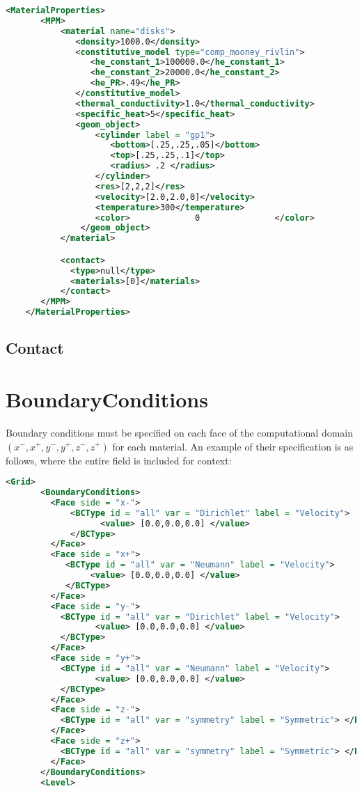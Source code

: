 \begin{lstlisting}[language=XML]
    <MaterialProperties>
       <MPM>
           <material name="disks">
              <density>1000.0</density>
              <constitutive_model type="comp_mooney_rivlin">
                 <he_constant_1>100000.0</he_constant_1>
                 <he_constant_2>20000.0</he_constant_2>
                 <he_PR>.49</he_PR>
              </constitutive_model>
              <thermal_conductivity>1.0</thermal_conductivity>
              <specific_heat>5</specific_heat>
              <geom_object>
                  <cylinder label = "gp1">
                     <bottom>[.25,.25,.05]</bottom>
                     <top>[.25,.25,.1]</top>
                     <radius> .2 </radius>
                  </cylinder>
                  <res>[2,2,2]</res>
                  <velocity>[2.0,2.0,0]</velocity>
                  <temperature>300</temperature>
                  <color>             0               </color>
               </geom_object>
           </material>

           <contact>
             <type>null</type>
             <materials>[0]</materials>
           </contact>
       </MPM>
    </MaterialProperties>
\end{lstlisting}

\subsection{Contact}  \label{Sec:Contact}


\section{BoundaryConditions} \label{Sec:MPM_BCs}

Boundary conditions must be specified on each face of the computational
domain $(x^-, x^+, y^-, y^+,z^-,z^+)$ for each material.  An example of their
specification is as follows, where the entire  field
is included for context:
\begin{lstlisting}[language=XML]
    <Grid>
       <BoundaryConditions>
         <Face side = "x-">
             <BCType id = "all" var = "Dirichlet" label = "Velocity">
                   <value> [0.0,0.0,0.0] </value>
             </BCType>
         </Face>
         <Face side = "x+">
            <BCType id = "all" var = "Neumann" label = "Velocity">
                 <value> [0.0,0.0,0.0] </value>
            </BCType>
         </Face>
         <Face side = "y-">
           <BCType id = "all" var = "Dirichlet" label = "Velocity">
                  <value> [0.0,0.0,0.0] </value>
           </BCType>
         </Face>
         <Face side = "y+">
           <BCType id = "all" var = "Neumann" label = "Velocity">
                  <value> [0.0,0.0,0.0] </value>
           </BCType>
         </Face>
         <Face side = "z-">
           <BCType id = "all" var = "symmetry" label = "Symmetric"> </BCType>
         </Face>
         <Face side = "z+">
           <BCType id = "all" var = "symmetry" label = "Symmetric"> </BCType>
         </Face>
       </BoundaryConditions>
       <Level>
\end{lstlisting}

